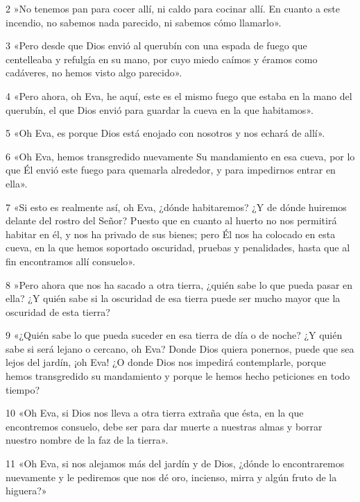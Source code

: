 \par 2 »No tenemos pan para cocer allí, ni caldo para cocinar allí. En cuanto a este incendio, no sabemos nada parecido, ni sabemos cómo llamarlo».

\par 3 «Pero desde que Dios envió al querubín con una espada de fuego que centelleaba y refulgía en su mano, por cuyo miedo caímos y éramos como cadáveres, no hemos visto algo parecido».

\par 4 «Pero ahora, oh Eva, he aquí, este es el mismo fuego que estaba en la mano del querubín, el que Dios envió para guardar la cueva en la que habitamos».

\par 5 «Oh Eva, es porque Dios está enojado con nosotros y nos echará de allí».

\par 6 «Oh Eva, hemos transgredido nuevamente Su mandamiento en esa cueva, por lo que Él envió este fuego para quemarla alrededor, y para impedirnos entrar en ella».

\par 7 «Si esto es realmente así, oh Eva, ¿dónde habitaremos? ¿Y de dónde huiremos delante del rostro del Señor? Puesto que en cuanto al huerto no nos permitirá habitar en él, y nos ha privado de sus bienes; pero Él nos ha colocado en esta cueva, en la que hemos soportado oscuridad, pruebas y penalidades, hasta que al fin encontramos allí consuelo».

\par 8 »Pero ahora que nos ha sacado a otra tierra, ¿quién sabe lo que pueda pasar en ella? ¿Y quién sabe si la oscuridad de esa tierra puede ser mucho mayor que la oscuridad de esta tierra?

\par 9 «¿Quién sabe lo que pueda suceder en esa tierra de día o de noche? ¿Y quién sabe si será lejano o cercano, oh Eva? Donde Dios quiera ponernos, puede que sea lejos del jardín, ¡oh Eva! ¿O donde Dios nos impedirá contemplarle, porque hemos transgredido su mandamiento y porque le hemos hecho peticiones en todo tiempo?

\par 10 «Oh Eva, si Dios nos lleva a otra tierra extraña que ésta, en la que encontremos consuelo, debe ser para dar muerte a nuestras almas y borrar nuestro nombre de la faz de la tierra».

\par 11 «Oh Eva, si nos alejamos más del jardín y de Dios, ¿dónde lo encontraremos nuevamente y le pediremos que nos dé oro, incienso, mirra y algún fruto de la higuera?»

